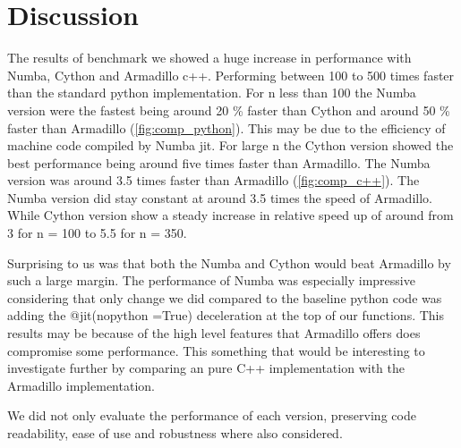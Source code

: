 \section*{Discussion}

The results of benchmark we showed a huge increase in performance with Numba,
Cython and Armadillo c++. Performing between 100 to 500 times faster than the standard python implementation.
For n less than 100 the Numba version were the fastest being around 20
\% faster than Cython and around 50 \% faster than Armadillo (\cref{fig:comp_python}). This may be due to the
efficiency of machine code compiled by Numba jit. For large n the Cython version
showed the best performance being around five times faster than Armadillo. The
Numba version was around 3.5 times faster than Armadillo (\cref{fig:comp_c++}).
The Numba version did stay constant at around 3.5 times the speed of Armadillo.
While Cython version show a steady increase in relative speed up of around from
3 for n = 100 to 5.5 for n = 350. 


Surprising to us was that both the Numba and Cython would beat Armadillo by such
a large margin. The performance of Numba was especially impressive considering
that only change we did compared to the baseline python code was adding the
@jit(nopython =True) deceleration at the top of our functions. This results may
be because of the high level features that Armadillo offers does compromise some
performance. This something that would be interesting to investigate further by
comparing an pure C++ implementation with the Armadillo implementation.

We did not only evaluate the performance of each version, preserving code
readability, ease of use and robustness where also considered.  

